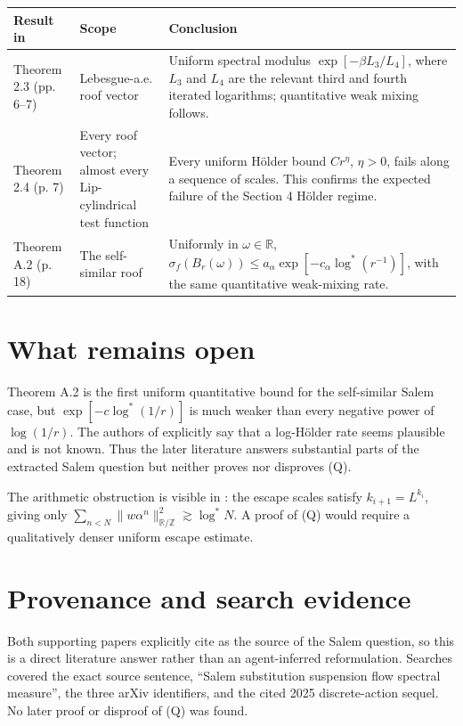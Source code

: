 \documentclass[11pt]{article}
\newcommand{\R}{\mathbb R}
\newcommand{\sig}{\sigma}
\begin{document}
\begin{center}
\begin{tabular}{>{\raggedright\arraybackslash}p{}
                >{\raggedright\arraybackslash}p{}
                >{\raggedright\arraybackslash}p{}}
\toprule
Result in \cite{MS26} & Scope & Conclusion \\
\midrule
Theorem 2.3 (pp. 6--7) & Lebesgue-a.e. roof vector & Uniform spectral modulus
\(\exp[-\beta L_3/L_4]\), where \(L_3\) and \(L_4\) are the relevant third
and fourth iterated logarithms; quantitative weak mixing follows. \\
Theorem 2.4 (p. 7) & Every roof vector; almost every Lip-cylindrical test function &
Every uniform H\"older bound \(Cr^\eta\), \(\eta>0\), fails along a sequence
of scales.  This confirms the expected failure of the Section 4 H\"older
regime. \\
Theorem A.2 (p. 18) & The self-similar roof & Uniformly in \(\omega\in\R\),
\(\sig_f(B_r(\omega))\le a_\alpha\exp[-c_\alpha\log^*(r^{-1})]\), with the
same quantitative weak-mixing rate. \\
\bottomrule
\end{tabular}
\end{center}

\section*{What remains open}
Theorem A.2 is the first uniform quantitative bound for the self-similar Salem
case, but \(\exp[-c\log^*(1/r)]\) is much weaker than every negative power of
\(\log(1/r)\).  The authors of \cite{MS26} explicitly say that a log-H\"older
rate seems plausible and is not known.  Thus the later literature answers
substantial parts of the extracted Salem question but neither proves nor
disproves (Q).

The arithmetic obstruction is visible in \cite[Proposition A.3]{MS26}: the
escape scales satisfy \(k_{i+1}=L^{k_i}\), giving only
\(\sum_{n<N}\|w\alpha^n\|_{\R/\mathbb Z}^2\gtrsim\log^*N\).  A proof of (Q)
would require a qualitatively denser uniform escape estimate.

\section*{Provenance and search evidence}
Both supporting papers explicitly cite \cite{BS14} as the source of the Salem
question, so this is a direct literature answer rather than an agent-inferred
reformulation.  Searches covered the exact source sentence, ``Salem
substitution suspension flow spectral measure'', the three arXiv identifiers,
and the cited 2025 discrete-action sequel.  No later proof or disproof of (Q)
was found.
\end{document}
